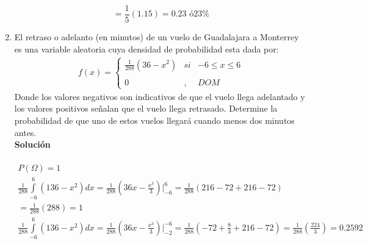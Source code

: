 \begin{enumerate}
\[    \] 
    \[=\frac{1}{5}(1.15)= 0.23 \text{ ó} 23\% 
    \]
    \item El retraso o adelanto (en minutos) de un vuelo de Guadalajara a Monterrey es una variable aleatoria cuya densidad de probabilidad esta dada por: \\
    \begin{align*}
    f(x)= \left\{ \begin{array}{lcc}
    \frac{1}{288}(36 - x^2) &   si  & -6 \leq x \leq 6 \\
    \\ 0 &  ,  & DOM
    \end{array}
    \right.
    \end{align*}
    Donde los valores negativos son indicativos de que el vuelo llega adelantado y los valores positivos señalan que el vuelo llega retrasado. Determine la probabilidad de que uno de estos vuelos llegará cuando menos dos minutos antes.
    \\\textbf{Solución}
    \\ \\
    \begin{gather*}
    P(\Omega) = 1 \\
    \frac{1}{288} \int \limits_{-6}^{6} (136-x^2) dx 
    = \frac{1}{288}(36x - \frac{x^3}{3})  \bigg\vert_{-6}^6 = \frac{1}{288}(216 - 72 + 216 - 72) \\		
    = \frac{1}{288}(288) = 1 \\
    \frac{1}{288} \int \limits_{-6}^{6} (136-x^2) dx 
    = \frac{1}{288}(36x - \frac{x^3}{3})  \bigg\vert_{-2}^{-6} = \frac{1}{288}(-72 + \frac{8}{3} + 216 - 72) = \frac{1}{288}(\frac{224}{3}) = 0.2592 \\
    \end{gather*}
    

\end{enumerate}
